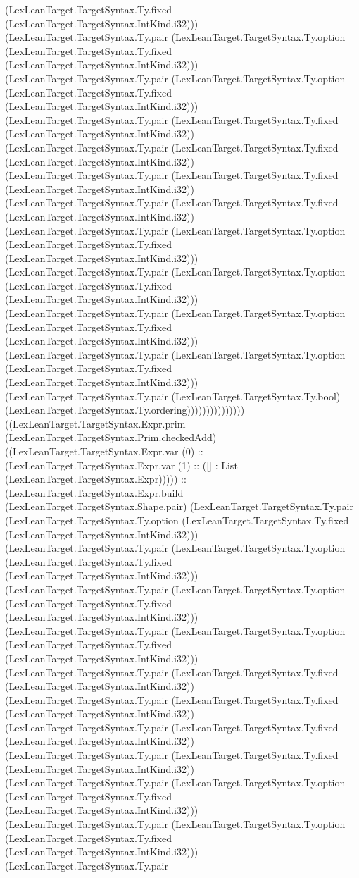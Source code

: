 \documentclass[11pt]{article}
\begin{document}
(LexLeanTarget.TargetSyntax.Ty.fixed (LexLeanTarget.TargetSyntax.IntKind.i32))) (LexLeanTarget.TargetSyntax.Ty.pair (LexLeanTarget.TargetSyntax.Ty.option (LexLeanTarget.TargetSyntax.Ty.fixed (LexLeanTarget.TargetSyntax.IntKind.i32))) (LexLeanTarget.TargetSyntax.Ty.pair (LexLeanTarget.TargetSyntax.Ty.option (LexLeanTarget.TargetSyntax.Ty.fixed (LexLeanTarget.TargetSyntax.IntKind.i32))) (LexLeanTarget.TargetSyntax.Ty.pair (LexLeanTarget.TargetSyntax.Ty.fixed (LexLeanTarget.TargetSyntax.IntKind.i32)) (LexLeanTarget.TargetSyntax.Ty.pair (LexLeanTarget.TargetSyntax.Ty.fixed (LexLeanTarget.TargetSyntax.IntKind.i32)) (LexLeanTarget.TargetSyntax.Ty.pair (LexLeanTarget.TargetSyntax.Ty.fixed (LexLeanTarget.TargetSyntax.IntKind.i32)) (LexLeanTarget.TargetSyntax.Ty.pair (LexLeanTarget.TargetSyntax.Ty.fixed (LexLeanTarget.TargetSyntax.IntKind.i32)) (LexLeanTarget.TargetSyntax.Ty.pair (LexLeanTarget.TargetSyntax.Ty.option (LexLeanTarget.TargetSyntax.Ty.fixed (LexLeanTarget.TargetSyntax.IntKind.i32))) (LexLeanTarget.TargetSyntax.Ty.pair (LexLeanTarget.TargetSyntax.Ty.option (LexLeanTarget.TargetSyntax.Ty.fixed (LexLeanTarget.TargetSyntax.IntKind.i32))) (LexLeanTarget.TargetSyntax.Ty.pair (LexLeanTarget.TargetSyntax.Ty.option (LexLeanTarget.TargetSyntax.Ty.fixed (LexLeanTarget.TargetSyntax.IntKind.i32))) (LexLeanTarget.TargetSyntax.Ty.pair (LexLeanTarget.TargetSyntax.Ty.option (LexLeanTarget.TargetSyntax.Ty.fixed (LexLeanTarget.TargetSyntax.IntKind.i32))) (LexLeanTarget.TargetSyntax.Ty.pair (LexLeanTarget.TargetSyntax.Ty.bool) (LexLeanTarget.TargetSyntax.Ty.ordering))))))))))))))) ((LexLeanTarget.TargetSyntax.Expr.prim (LexLeanTarget.TargetSyntax.Prim.checkedAdd) ((LexLeanTarget.TargetSyntax.Expr.var (0) :: (LexLeanTarget.TargetSyntax.Expr.var (1) :: ([] : List (LexLeanTarget.TargetSyntax.Expr))))) :: (LexLeanTarget.TargetSyntax.Expr.build (LexLeanTarget.TargetSyntax.Shape.pair) (LexLeanTarget.TargetSyntax.Ty.pair (LexLeanTarget.TargetSyntax.Ty.option (LexLeanTarget.TargetSyntax.Ty.fixed (LexLeanTarget.TargetSyntax.IntKind.i32))) (LexLeanTarget.TargetSyntax.Ty.pair (LexLeanTarget.TargetSyntax.Ty.option (LexLeanTarget.TargetSyntax.Ty.fixed (LexLeanTarget.TargetSyntax.IntKind.i32))) (LexLeanTarget.TargetSyntax.Ty.pair (LexLeanTarget.TargetSyntax.Ty.option (LexLeanTarget.TargetSyntax.Ty.fixed (LexLeanTarget.TargetSyntax.IntKind.i32))) (LexLeanTarget.TargetSyntax.Ty.pair (LexLeanTarget.TargetSyntax.Ty.option (LexLeanTarget.TargetSyntax.Ty.fixed (LexLeanTarget.TargetSyntax.IntKind.i32))) (LexLeanTarget.TargetSyntax.Ty.pair (LexLeanTarget.TargetSyntax.Ty.fixed (LexLeanTarget.TargetSyntax.IntKind.i32)) (LexLeanTarget.TargetSyntax.Ty.pair (LexLeanTarget.TargetSyntax.Ty.fixed (LexLeanTarget.TargetSyntax.IntKind.i32)) (LexLeanTarget.TargetSyntax.Ty.pair (LexLeanTarget.TargetSyntax.Ty.fixed (LexLeanTarget.TargetSyntax.IntKind.i32)) (LexLeanTarget.TargetSyntax.Ty.pair (LexLeanTarget.TargetSyntax.Ty.fixed (LexLeanTarget.TargetSyntax.IntKind.i32)) (LexLeanTarget.TargetSyntax.Ty.pair (LexLeanTarget.TargetSyntax.Ty.option (LexLeanTarget.TargetSyntax.Ty.fixed (LexLeanTarget.TargetSyntax.IntKind.i32))) (LexLeanTarget.TargetSyntax.Ty.pair (LexLeanTarget.TargetSyntax.Ty.option (LexLeanTarget.TargetSyntax.Ty.fixed (LexLeanTarget.TargetSyntax.IntKind.i32))) (LexLeanTarget.TargetSyntax.Ty.pair 
\end{document}
